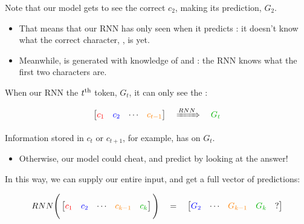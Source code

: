         

        

        \phantom{}

        Note that our model gets to see the correct $c_2$,  making its prediction, $G_2$.

        \begin{itemize}
            \item That means that our RNN has only seen  when it predicts : it doesn't know what the correct character, , is yet.

            \item Meanwhile,  is generated with knowledge of  and : the RNN knows what the first two characters are.\\
        \end{itemize}

        

        \begin{concept}
            When our RNN  the $t^{ \text{th} }$ token, $G_t$, it can only see the :

            \begin{equation*}
                \begin{bmatrix}
                    \red{c_1} & \blu{c_2} & \cdots & \org{c_{t-1}}
                \end{bmatrix}
                \quad \xRightarrow[]{RNN} \quad
                \grn{G_{t}}
            \end{equation*}

            Information stored in $c_t$ or $c_{t+1}$, for example, has  on $G_t$.

            \begin{itemize}
                \item Otherwise, our model could cheat, and predict by looking at the answer!
            \end{itemize}
        \end{concept}

        In this way, we can supply our entire input, and get a full vector of predictions:

        \begin{equation}
            RNN 
            \Bigg(
            \begin{bmatrix}
                \red{c_1} & \blu{c_2} & \cdots & \org{c_{k-1}} & \grn{c_{k}}
            \end{bmatrix}
            \Bigg)
            \quad=\quad 
            \begin{bmatrix}
                \blu{G_2} & \cdots & \org{G_{k-1}} & \grn{G_{k}} & ?
            \end{bmatrix}
        \end{equation}

